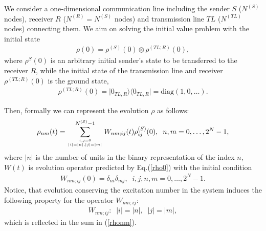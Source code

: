 \documentclass[pra,preprint,showpacs]{revtex4-1}
\begin{document}
We consider a one-dimensional communication line including the sender $S$ {($N^{(S)}$ nodes)}, receiver $R$ {($N^{(R)}=N^{(S)}$ nodes)} and transmission line $TL$  {($N^{(TL)}$ nodes)} connecting them.
We aim on solving the initial value problem with the
initial state
\begin{eqnarray}\label{rho0}
\rho(0)=\rho^{(S)}(0)\otimes \rho^{(TL;R)}(0),
\end{eqnarray}
where $\rho^S(0)$ is an arbitrary  initial sender's state to be transferred to the receiver $R$, while the initial state of the transmission line and receiver $\rho^{(TL;R)}(0)$ is the ground state,
\begin{eqnarray}
\rho^{(TL;R)}(0) = |0_{TL,R}\rangle
{\langle 0_{TL,R}|} = {\mbox{diag}}(1,0,\dots).
\end{eqnarray}

Then, formally we can represent the evolution $\rho$ as follows:
\begin{eqnarray}\label{rhonm}
\rho_{nm}(t)=\sum_{{i,j=0}\atop{|i|=|n|, |j|=|m|} }^{N^{(S)}-1} W_{nm;ij}(t)\rho_{ij}^{(S)}(0) ,\;\;n,m=0,\dots,2^N-1,
\end{eqnarray}
where $|n|$ is the number of units in the binary representation of the index $n$,
 $W(t)$ is  evolution operator predicted by Eq.(\ref{rho0})
with the initial condition
\begin{eqnarray}\label{ic}
W_{nm;ij}(0) =
 \delta_{ni}\delta_{mj},\;\;i,j,n,m=0,\dots,2^{N}-1.
\end{eqnarray}
Notice, that evolution conserving the excitation number in the system induces the following property for the operator $W_{nm;ij}$:
\begin{eqnarray}
W_{nm;ij}: \;\;|i|=|n|,\;\;|j| = |m|,
\end{eqnarray}
which is reflected in the sum in  (\ref{rhonm}).
\end{document}
